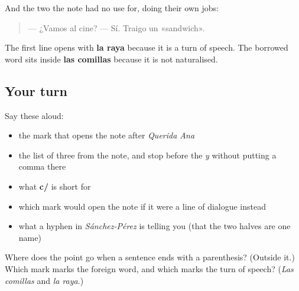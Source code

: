 \begin{tcolorbox}[breakable,skin=enhanced,colback=orange!6,colframe=orange!45!black,boxrule=0.5pt,arc=1mm,left=6pt,right=6pt,top=4pt,bottom=4pt,fonttitle=\bfseries,title={Read this}]
And the two the note had no use for, doing their own jobs:

\begin{quote}
— ¿Vamos al cine? — Sí. Traigo un «sandwich».
\end{quote}

The first line opens with \textbf{la raya} because it is a turn of speech. The borrowed word sits inside \textbf{las comillas} because it is not naturalised.
\end{tcolorbox}

\subsection*{Your turn}
Say these aloud:

\begin{itemize}
\raggedright
  \item the mark that opens the note after \emph{Querida Ana}
  \item the list of three from the note, and stop before the \emph{y} without putting a comma there
  \item what \textbf{c/} is short for
  \item which mark would open the note if it were a line of dialogue instead
  \item what a hyphen in \emph{Sánchez-Pérez} is telling you (that the two halves are one name)
\end{itemize}

\begin{tcolorbox}[breakable,colback=teal!4,colframe=teal!35!black,title={Before you move on}]
Where does the point go when a sentence ends with a parenthesis? (Outside it.) Which mark marks the foreign word, and which marks the turn of speech? (\emph{Las comillas} and \emph{la raya}.)
\end{tcolorbox}
